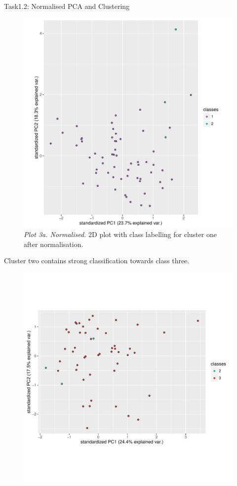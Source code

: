 \documentclass[11pt]{article}
\begin{document}
\begin{subsection}{Task1.2: Normalised PCA and Clustering}
\begin{figure}[H]
    \includegraphics[width=1.0\textwidth]{p3a_n}
    \caption{\textit{Plot 3a. Normalised.} 2D plot with class labelling for cluster one after normalisation.}
    \label{fig:p3a_n}
\end{figure}
\pagebreak Cluster two contains strong classification towards class three.
\begin{figure}[H]
    \centering
    \includegraphics[width=1.0\textwidth]{p3b_n}

\end{figure}
\end{subsection}
\end{document}
